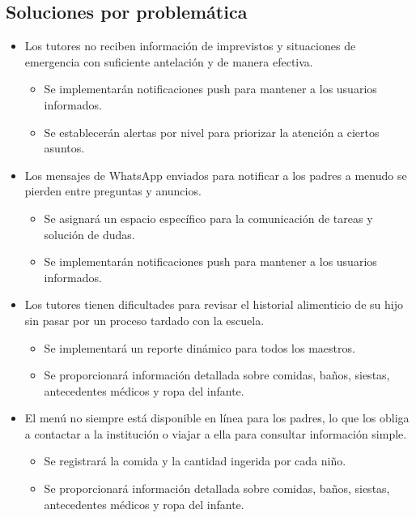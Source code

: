 \documentclass{article}
\begin{document}
\subsection*{Soluciones por problemática}
\begin{itemize}

	\item Los tutores no reciben información de imprevistos y situaciones de emergencia con suficiente antelación y de manera efectiva.
	      \begin{itemize}
		      \item Se implementarán notificaciones push para mantener a los usuarios informados.
		      \item Se establecerán alertas por nivel para priorizar la atención a ciertos asuntos.
	      \end{itemize}

	\item Los mensajes de WhatsApp enviados para notificar a los padres a menudo se pierden entre preguntas y anuncios.
	      \begin{itemize}
		      \item Se asignará un espacio específico para la comunicación de tareas y solución de dudas.
		      \item Se implementarán notificaciones push para mantener a los usuarios informados.
	      \end{itemize}

	\item Los tutores tienen dificultades para revisar el historial alimenticio de su hijo sin pasar por un proceso tardado con la escuela.
	      \begin{itemize}
		      \item Se implementará un reporte dinámico para todos los maestros.
		      \item Se proporcionará información detallada sobre comidas, baños, siestas, antecedentes médicos y ropa del infante.
	      \end{itemize}

	\item El menú no siempre está disponible en línea para los padres, lo que los obliga a contactar a la institución o viajar a ella para consultar información simple.
	      \begin{itemize}
		      \item Se registrará la comida y la cantidad ingerida por cada niño.
		      \item Se proporcionará información detallada sobre comidas, baños, siestas, antecedentes médicos y ropa del infante.
	      \end{itemize}



\end{itemize}
\end{document}
